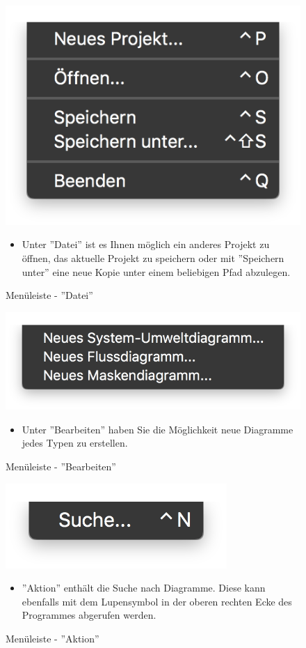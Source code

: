 \begin{figure}[h!]
	\centering
	\includegraphics[width=.4\textwidth]{Leiste_Datei.png}
	\caption{Menüleiste - ''Datei''}
\begin{itemize}
\item Unter ''Datei'' ist es Ihnen möglich ein anderes Projekt zu öffnen, das aktuelle Projekt zu speichern oder mit ''Speichern unter'' eine neue Kopie unter einem beliebigen Pfad abzulegen.
\end{itemize}
\end{figure}


\begin{figure}[h!]
	\centering
	\includegraphics[width=.4\textwidth]{Leiste_Bearbeiten.png}
	\caption{Menüleiste - ''Bearbeiten''}
\begin{itemize}
\item Unter ''Bearbeiten'' haben Sie die Möglichkeit neue Diagramme jedes Typen zu erstellen.
\end{itemize}
\end{figure}


\begin{figure}[h!]
	\centering
	\includegraphics[width=.4\textwidth]{Leiste_Aktion.png}
	\caption{Menüleiste - ''Aktion''}
\begin{itemize}
\item ''Aktion'' enthält die Suche nach Diagramme. Diese kann ebenfalls mit dem Lupensymbol in der oberen rechten Ecke des Programmes abgerufen werden.
\end{itemize}
\end{figure}



